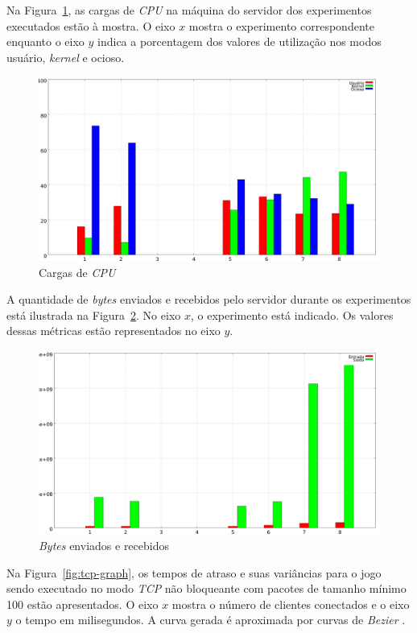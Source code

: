 \documentclass[12pt]{article}
\begin{document}
Na Figura~\ref{fig:cpu-graph}, as cargas de \emph{CPU} na máquina do servidor dos experimentos executados estão à mostra. O eixo $x$ mostra o experimento correspondente enquanto o eixo $y$ indica a porcentagem dos valores de utilização nos modos usuário, \emph{kernel} e ocioso.

\begin{figure}[ht]
  \centering
  \includegraphics[width=1\textwidth]{img/cpu-graph.png}
  \caption{Cargas de \emph{CPU}}
  \label{fig:cpu-graph}
\end{figure}

A quantidade de \emph{bytes} enviados e recebidos pelo servidor durante os experimentos está ilustrada na Figura~\ref{fig:net-graph}. No eixo $x$, o experimento está indicado. Os valores dessas métricas estão representados no eixo $y$.

\begin{figure}[ht!]
  \centering
  \includegraphics[width=1\textwidth]{img/net-graph.png}
  \caption{\emph{Bytes} enviados e recebidos}
  \label{fig:net-graph}
\end{figure}

Na Figura~\ref{fig:tcp-graph}, os tempos de atraso e suas variâncias para o jogo sendo executado no modo \emph{TCP} não bloqueante com pacotes de tamanho mínimo 100 estão apresentados. O eixo $x$ mostra o número de clientes conectados e o eixo $y$ o tempo em milisegundos. A curva gerada é aproximada por curvas de \emph{Bezier} \cite{Bezier}.
\end{document}
